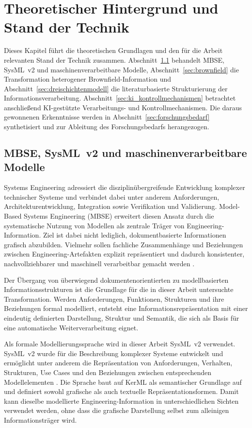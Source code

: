 \section{Theoretischer Hintergrund und Stand der Technik}
\label{sec:grundlagen}

Dieses Kapitel führt die theoretischen Grundlagen und den für die Arbeit
relevanten Stand der Technik zusammen. Abschnitt~\ref{sec:mbse_sysml}
behandelt MBSE, SysML~v2 und maschinenverarbeitbare Modelle,
Abschnitt~\ref{sec:brownfield} die Transformation heterogener
Brownfield-Information und Abschnitt~\ref{sec:dreischichtenmodell} die
literaturbasierte Strukturierung der Informationsverarbeitung.
Abschnitt~\ref{sec:ki_kontrollmechanismen} betrachtet anschließend
KI-gestützte Verarbeitungs- und Kontrollmechanismen. Die daraus gewonnenen
Erkenntnisse werden in Abschnitt~\ref{sec:forschungsbedarf} synthetisiert und
zur Ableitung des Forschungsbedarfs herangezogen.

\subsection{MBSE, SysML~v2 und maschinenverarbeitbare Modelle}
\label{sec:mbse_sysml}

Systems Engineering adressiert die disziplinübergreifende Entwicklung
komplexer technischer Systeme und verbindet dabei unter anderem Anforderungen,
Architekturentwicklung, Integration sowie Verifikation und Validierung.
Model-Based Systems Engineering (MBSE) erweitert diesen Ansatz durch die
systematische Nutzung von Modellen als zentrale Träger von
Engineering-Information. Ziel ist dabei nicht lediglich, dokumentbasierte
Informationen grafisch abzubilden. Vielmehr sollen fachliche Zusammenhänge
und Beziehungen zwischen Engineering-Artefakten explizit repräsentiert und
dadurch konsistenter, nachvollziehbarer und maschinell verarbeitbar gemacht
werden \cite{Hendriks2022}.

Der Übergang von überwiegend dokumentenorientierten zu modellbasierten
Informationsstrukturen ist die Grundlage für die in dieser Arbeit untersuchte
Transformation. Werden Anforderungen, Funktionen, Strukturen und ihre
Beziehungen formal modelliert, entsteht eine Informationsrepräsentation mit
einer eindeutig definierten Darstellung, Struktur und Semantik, die sich als
Basis für eine automatische Weiterverarbeitung eignet.

Als formale Modellierungssprache wird in dieser Arbeit SysML~v2 verwendet.
SysML~v2 wurde für die Beschreibung komplexer Systeme entwickelt und
ermöglicht unter anderem die Repräsentation von Anforderungen, Verhalten,
Strukturen, Use Cases und den Beziehungen zwischen entsprechenden
Modellelementen \cite{SysMLv2}. Die Sprache baut auf KerML als semantischer
Grundlage auf und definiert sowohl grafische als auch textuelle
Repräsentationsformen. Damit kann dieselbe modellierte Engineering-Information
in unterschiedlichen Sichten verwendet werden, ohne dass die grafische
Darstellung selbst zum alleinigen Informationsträger wird.


